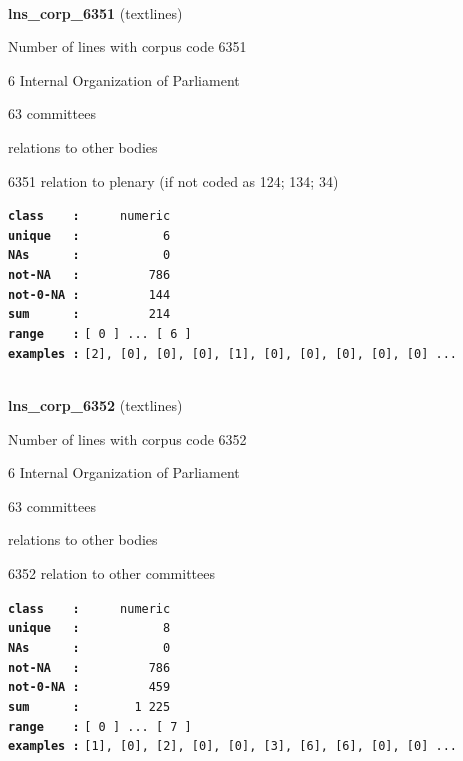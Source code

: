\documentclass[]{article}
\begin{document}
~

\textbf{lns\_corp\_6351} (textlines)

Number of lines with corpus code 6351

6 Internal Organization of Parliament

63 committees

relations to other bodies

6351 relation to plenary (if not coded as 124; 134; 34)

\textbf{\texttt{class\ \ \ \ :}} \texttt{~~~~~numeric}\\
\textbf{\texttt{unique\ \ \ :}} \texttt{~~~~~~~~~~~6}\\
\textbf{\texttt{NAs\ \ \ \ \ \ :}} \texttt{~~~~~~~~~~~0}\\
\textbf{\texttt{not-NA\ \ \ :}} \texttt{~~~~~~~~~786}\\
\textbf{\texttt{not-0-NA\ :}} \texttt{~~~~~~~~~144}\\
\textbf{\texttt{sum\ \ \ \ \ \ :}} \texttt{~~~~~~~~~214}\\
\textbf{\texttt{range\ \ \ \ :}}
\texttt{{[}\ 0\ {]}\ ...\ {[}\ 6\ {]}}\\
\textbf{\texttt{examples\ :}}
\texttt{{[}2{]},\ {[}0{]},\ {[}0{]},\ {[}0{]},\ {[}1{]},\ {[}0{]},\ {[}0{]},\ {[}0{]},\ {[}0{]},\ {[}0{]}\ ...}\\

~

\textbf{lns\_corp\_6352} (textlines)

Number of lines with corpus code 6352

6 Internal Organization of Parliament

63 committees

relations to other bodies

6352 relation to other committees

\textbf{\texttt{class\ \ \ \ :}} \texttt{~~~~~numeric}\\
\textbf{\texttt{unique\ \ \ :}} \texttt{~~~~~~~~~~~8}\\
\textbf{\texttt{NAs\ \ \ \ \ \ :}} \texttt{~~~~~~~~~~~0}\\
\textbf{\texttt{not-NA\ \ \ :}} \texttt{~~~~~~~~~786}\\
\textbf{\texttt{not-0-NA\ :}} \texttt{~~~~~~~~~459}\\
\textbf{\texttt{sum\ \ \ \ \ \ :}} \texttt{~~~~~~~1~225}\\
\textbf{\texttt{range\ \ \ \ :}}
\texttt{{[}\ 0\ {]}\ ...\ {[}\ 7\ {]}}\\
\textbf{\texttt{examples\ :}}
\texttt{{[}1{]},\ {[}0{]},\ {[}2{]},\ {[}0{]},\ {[}0{]},\ {[}3{]},\ {[}6{]},\ {[}6{]},\ {[}0{]},\ {[}0{]}\ ...}\\
\end{document}
